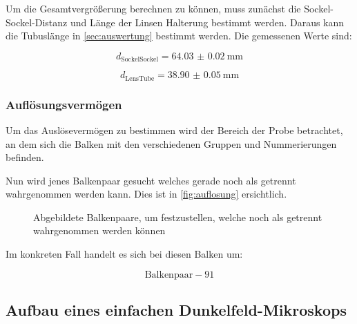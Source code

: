 \documentclass[12pt,english,ngerman]{scrartcl}
\begin{document}
Um die Gesamtvergrößerung berechnen zu können, muss zunächst die
Sockel-Sockel-Distanz und Länge der Linsen Halterung bestimmt werden. Daraus
kann die Tubuslänge in \autoref{sec:auswertung} bestimmt werden. Die gemessenen
Werte sind:

\begin{equation*}
	d_\text{SockelSockel}=\SI{64.03(2)}{\mm}
\end{equation*}

\begin{equation*}
	d_\text{LensTube}=\SI{38.90(5)}{\mm}
\end{equation*}

\subsubsection{Auflösungsvermögen}

Um das Auslösevermögen zu bestimmen wird der Bereich der Probe betrachtet, an
dem sich die Balken mit den verschiedenen Gruppen und Nummerierungen befinden.

Nun wird jenes Balkenpaar gesucht welches gerade noch als getrennt wahrgenommen
werden kann. Dies ist in \autoref{fig:auflosung} ersichtlich.

\begin{figure}[H]
	\begin{center}
	\end{center}
	\caption[Abgebildete Balkenpaare, um festzustellen, welche noch als getrennt
		wahrgenommen werden können] { Abgebildete Balkenpaare, um festzustellen, welche
		noch als getrennt wahrgenommen werden können
	}\label{fig:auflosung}
\end{figure}

Im konkreten Fall handelt es sich bei diesen Balken um:

\begin{equation*}
	\text{Balkenpaar} - 91
\end{equation*}

\subsection{Aufbau eines einfachen Dunkelfeld-Mikroskops}
\end{document}
